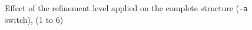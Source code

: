 \documentclass[10pt]{article}
\begin{document}
\begin{figure}[htb]
{  \label{f:pieref5}
 }
\centering
 \caption{Effect of the refinement level applied on the complete structure (\texttt{-a} switch), (1 to 6)}
\label{fig:pieref}
\end{figure}
%
\begin{figure}[htb]
\centering
\centering
\centering
\end{figure}
\end{document}
